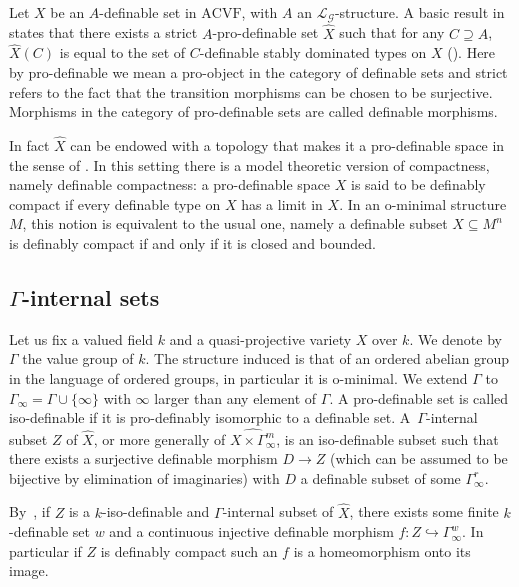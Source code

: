 \documentclass[JEP,XML,SOM,Unicode,ThmDefs,NoEqCountersInSection,published]{cedram}
\newcommand{\acvf}{\mathrm{ACVF}}
\theoremstyle{plain}
\theoremstyle{definition}
\begin{document}
Let $X$ be an $A$-definable set in $\acvf$, with $A$ an ${\mathcal L}_{\mathcal{G}}$-structure.
A basic result in~\cite{HL} states that
there exists a strict $A$-pro-definable set $\widehat{X}$ such that for any $C \supseteq A$, $\widehat{X} (C) $ is equal to the set of $C$-definable stably dominated types on $X$ (\cite[Th.\,3.1]{HL}).
Here by pro-definable we mean a pro-object in the category of definable sets and strict refers to the fact that the transition morphisms can be chosen to be surjective.
Morphisms in the category of pro-definable sets are called definable morphisms.

In fact $\widehat{X}$ can be endowed with a topology that makes it a pro-definable space in the sense of \cite[\S 3.3]{HL}.
In this setting there is a model theoretic version of compactness, namely definable compactness:
a pro-definable space $X$ is said to be definably compact if every definable type on $X$ has a limit in $X$.
In an o-minimal structure $M$, this notion is equivalent to the usual one, namely a definable subset $X \subseteq M^n$ is definably compact if and only if it is closed and bounded.

\subsection{$\Gamma$-internal sets}Let us fix a valued field $k$ and a quasi-projective variety $X$ over $k$. We denote by $\Gamma$ the value group of $k$. The structure induced is that of an ordered abelian group in the language of ordered groups, in particular it is o-minimal. We extend $\Gamma$ to $\Gamma_\infty = \Gamma \cup \{\infty\}$ with $\infty$ larger than any element of $\Gamma$.
A pro-definable set is called iso-definable if it is pro-definably isomorphic to a definable set.
A~$\Gamma$\nobreakdash-inter\-nal subset $Z$ of $\widehat{X}$, or more generally of $\widehat{X \times \Gamma_\infty^m}$, is an iso-definable subset such that there exists a surjective definable morphism
$D \to Z$ (which can be assumed to be bijective by elimination of imaginaries)
with $D$ a definable subset of some $\Gamma_\infty^r$.

By~\cite[Th.\,6.2.8]{HL},
if $Z$ is a $k$-iso-definable and $\Gamma$-internal subset of $\widehat{X}$,
there exists some finite $k$-definable set $w$ and a continuous injective definable morphism
$f: Z \hookrightarrow \Gamma_\infty^w$. In particular if $Z$ is definably compact such an $f$ is a homeomorphism onto its image.
\end{document}
